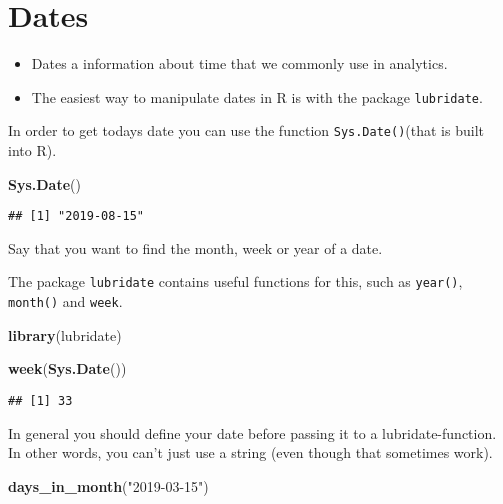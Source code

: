\documentclass[]{book}
\newenvironment{Shaded}{\begin{snugshade}}{\end{snugshade}}
\newcommand{\KeywordTok}[1]{\textcolor[rgb]{0.13,0.29,0.53}{\textbf{#1}}}
\newcommand{\NormalTok}[1]{#1}
\newcommand{\StringTok}[1]{\textcolor[rgb]{0.31,0.60,0.02}{#1}}
\providecommand{\tightlist}{%
  \setlength{\itemsep}{0pt}\setlength{\parskip}{0pt}}
\begin{document}
\hypertarget{dates}{%
\section{Dates}\label{dates}}

\begin{itemize}
\tightlist
\item
  Dates a information about time that we commonly use in analytics.
\item
  The easiest way to manipulate dates in R is with the package \texttt{lubridate}.
\end{itemize}

In order to get todays date you can use the function \texttt{Sys.Date()}(that is built into R).

\begin{Shaded}
\begin{Highlighting}[]
\KeywordTok{Sys.Date}\NormalTok{()}
\end{Highlighting}
\end{Shaded}

\begin{verbatim}
## [1] "2019-08-15"
\end{verbatim}

Say that you want to find the month, week or year of a date.

The package \texttt{lubridate} contains useful functions for this, such as \texttt{year()}, \texttt{month()} and \texttt{week}.

\begin{Shaded}
\begin{Highlighting}[]
\KeywordTok{library}\NormalTok{(lubridate)}

\KeywordTok{week}\NormalTok{(}\KeywordTok{Sys.Date}\NormalTok{())}
\end{Highlighting}
\end{Shaded}

\begin{verbatim}
## [1] 33
\end{verbatim}

In general you should define your date before passing it to a lubridate-function. In other words, you can't just use a string (even though that sometimes work).

\begin{Shaded}
\begin{Highlighting}[]
\KeywordTok{days_in_month}\NormalTok{(}\StringTok{"2019-03-15"}\NormalTok{)}
\end{Highlighting}
\end{Shaded}
\end{document}

